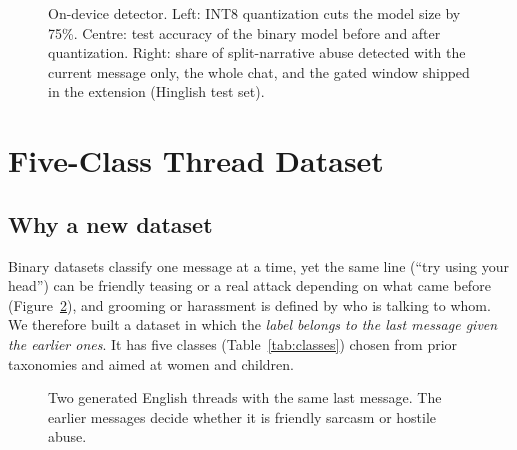 \documentclass[sigconf,9pt]{acmart}
\begin{document}
\begin{figure}[!t]
  \centering
  \resizebox{0.97\textwidth}{!}{}
  \caption{On-device detector. Left: INT8 quantization cuts the model size by 75\%. Centre: test accuracy of the binary model before and after quantization. Right: share of split-narrative abuse detected with the current message only, the whole chat, and the gated window shipped in the extension (Hinglish test set).}
  \label{fig:results1}
\end{figure}

\section{Five-Class Thread Dataset}\label{sec:data}

\subsection{Why a new dataset}
Binary datasets classify one message at a time, yet the same line (``try using your head'') can be friendly teasing or a real attack depending on what came before (Figure~\ref{fig:chats}), and grooming or harassment is defined by who is talking to whom. We therefore built a dataset in which the \emph{label belongs to the last message given the earlier ones}. It has five classes (Table~\ref{tab:classes}) chosen from prior taxonomies \cite{vanhee2018cyberbullying,guest2021misogyny,banko2020taxonomy,waseem2017understanding,mandl2019hasoc} and aimed at women and children.

\begin{figure}[h!]
  \centering
  \resizebox{\columnwidth}{!}{}
  \caption{Two generated English threads with the same last message. The earlier messages decide whether it is friendly sarcasm or hostile abuse.}
  \label{fig:chats}
\end{figure}
\end{document}
